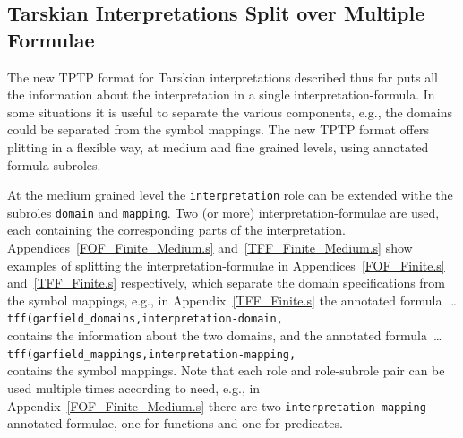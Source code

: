\documentclass{easychair}
\newcommand{\smalltt}[1]{\small \texttt{#1}}
\begin{document}
\subsection{Tarskian Interpretations Split over Multiple Formulae}
\label{NewTarskianSplit}

The new TPTP format for Tarskian interpretations described thus far puts all the information 
about the interpretation in a single interpretation-formula.
In some situations it is useful to separate the various components, e.g., the domains could be
separated from the symbol mappings.
The new TPTP format offers plitting in a flexible way, at medium and fine grained levels, using 
annotated formula subroles.

At the medium grained level the {\tt interpretation} role can be extended withe the subroles
{\tt domain} and {\tt mapping}.
Two (or more) interpretation-formulae are used, each containing the corresponding parts of the 
interpretation.
Appendices~\ref{FOF_Finite_Medium.s} and~\ref{TFF_Finite_Medium.s} show examples of
splitting the interpretation-formulae in Appendices~\ref{FOF_Finite.s} and~\ref{TFF_Finite.s} 
respectively, which separate the domain specifications from the symbol mappings, e.g., in 
Appendix~\ref{TFF_Finite.s} the annotated formula~\ldots \\
\hspace*{1.0em}\smalltt{tff(garfield\_domains,interpretation-domain,} \\
contains the information about the two domains, and the annotated formula~\ldots \\
\hspace*{1.0em}\smalltt{tff(garfield\_mappings,interpretation-mapping,} \\
contains the symbol mappings.
Note that each role and role-subrole pair can be used multiple times according to need, e.g.,
in Appendix~\ref{FOF_Finite_Medium.s} there are two {\tt interpretation-mapping} annotated
formulae, one for functions and one for predicates.
\end{document}
